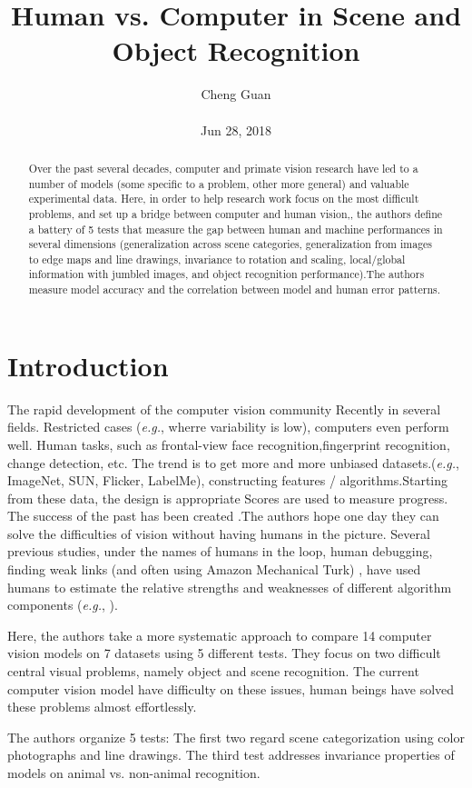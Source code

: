 \documentclass[10pt,twocolumn,letterpaper]{article}
\title{Human vs. Computer in Scene and Object Recognition}
\author{Cheng Guan\\\\
Jun 28, 2018}
\begin{document}
\maketitle
\begin{abstract}
Over the past several decades, computer and primate vision research have led to a number of models (some specific to a problem, other more general) and valuable experimental data. Here, in order to help research work focus on the most difficult problems, and set up a bridge between computer and human vision,, the authors define a battery of 5 tests that measure the gap between human and machine performances in several dimensions (generalization across scene categories, generalization from images to edge maps and line drawings, invariance to rotation and scaling, local/global information with jumbled images, and object recognition performance).The authors measure model accuracy and the correlation between model and human error patterns.
\end{abstract}
\section{Introduction}
The rapid development of the computer vision community Recently in several fields. Restricted cases (\emph{e.g.}, wherre variability is low), computers even perform well. Human tasks, such as frontal-view face recognition,fingerprint recognition, change detection, etc. The trend is to get more and more unbiased datasets.(\emph{e.g.}, ImageNet, SUN, Flicker, LabelMe), constructing features / algorithms.Starting from these data, the design is appropriate Scores are used to measure progress. The success of the past has been created .The authors hope one day they can solve the difficulties of vision without having humans in the picture. Several previous studies, under the names of humans in the loop, human debugging, finding weak links (and often using Amazon Mechanical Turk) \cite{Parikh2011Finding,Parikh2012Exploring,Fleuret2011Comparing,Mottaghi2013Analyzing,Hoiem2012Diagnosing}, have used humans to estimate the relative strengths and weaknesses
of different algorithm components (\emph{e.g.}, \cite{Fleuret2011Comparing}).
\par

Here, the authors take a more systematic approach to compare 14 computer vision models on 7 datasets using 5 different tests. They focus on two difficult central visual problems, namely object and scene recognition. The current computer vision model have difficulty on these issues, human beings have solved these problems almost effortlessly.
\par
The authors organize 5 tests: The first two regard scene categorization using color photographs and line drawings. The third test addresses invariance properties of models on animal vs. non-animal recognition.
\end{document}
